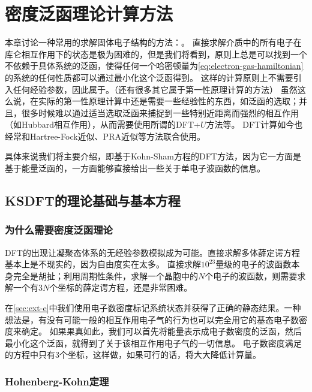 \chapter{密度泛函理论计算方法}\label{chap:dft}

本章讨论一种常用的求解固体电子结构的方法：。
直接求解介质中的所有电子在库仑相互作用下的状态是极为困难的，但是我们将看到，原则上总是可以找到一个不依赖于具体系统的泛函，使得任何一个哈密顿量为\eqref{eq:electron-gas-hamiltonian}的系统的任何性质都可以通过最小化这个泛函得到。
这样的计算原则上不需要引入任何经验参数，因此属于。（还有很多其它属于第一性原理计算的方法）
虽然这么说，在实际的第一性原理计算中还是需要一些经验性的东西，如泛函的选取；并且，很多时候难以通过适当选取泛函来捕捉到一些特别近距离而强烈的相互作用（如Hubbard相互作用），从而需要使用所谓的DFT+$U$方法等。
DFT计算如今也经常和Hartree-Fock近似、PRA近似等方法联合使用。

具体来说我们将主要介绍，即基于Kohn-Sham方程的DFT方法，因为它一方面是基于能量泛函的，一方面能够直接给出一些关于单电子波函数的信息。

\section{KSDFT的理论基础与基本方程}

\subsection{为什么需要密度泛函理论}

DFT的出现让凝聚态体系的无经验参数模拟成为可能。直接求解多体薛定谔方程基本上是不现实的，因为自由度实在太多。
直接求解$10^{23}$量级的电子的波函数本身完全是胡扯；利用周期性条件，求解一个晶胞中的$N$个电子的波函数，则需要求解一个有$3N$个坐标的薛定谔方程，还是非常困难。

在\autoref{sec:ext-e}中我们使用电子数密度标记系统状态并获得了正确的静态结果。一种想法是，有没有可能一般的相互作用电子气的行为也可以完全用它的基态电子数密度来确定。
如果果真如此，我们可以首先将能量表示成电子数密度的泛函，然后最小化这个泛函，就得到了关于该相互作用电子气的一切信息。
电子数密度满足的方程中只有$3$个坐标，这样做，如果可行的话，将大大降低计算量。

\subsection{Hohenberg-Kohn定理}\label{sec:hohenberg-kohn-theorem-spinless}

